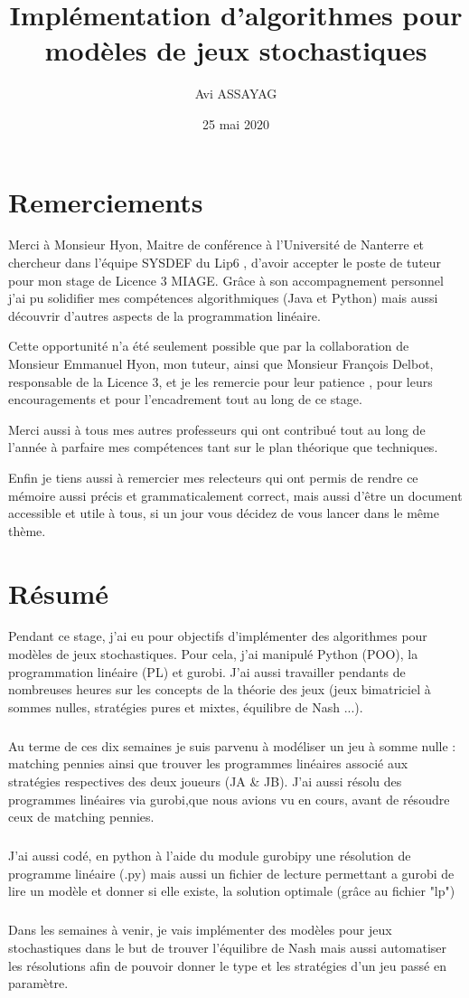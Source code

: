 \documentclass[a4paper, 12pt, twoside]{article}
\author{Avi ASSAYAG}
\title{Implémentation d'algorithmes pour modèles de jeux stochastiques}
\date{25 mai 2020}
\begin{document}
\pagedegarde


\section*{Remerciements}
Merci à Monsieur Hyon, Maitre de conférence à l'Université de Nanterre et chercheur dans l'équipe SYSDEF du Lip6 , d'avoir accepter le poste de tuteur pour mon stage de Licence 3 MIAGE. Grâce à son accompagnement personnel j'ai pu solidifier mes compétences algorithmiques (Java et Python) mais aussi découvrir d'autres aspects de la programmation linéaire.
\newline 

Cette opportunité n'a été seulement possible que par la collaboration de Monsieur Emmanuel Hyon, mon tuteur, ainsi que Monsieur François Delbot, responsable de la Licence 3, et je les remercie pour leur patience , pour leurs encouragements et pour l'encadrement tout au long de ce stage.
\newline

Merci aussi à tous mes autres professeurs qui ont contribué tout au long de l'année à parfaire  mes compétences tant sur le plan théorique que techniques. \newline

Enfin je tiens aussi à remercier mes relecteurs qui ont permis de rendre ce mémoire aussi précis et grammaticalement correct, mais aussi d'être un document accessible et utile à tous, si un jour vous décidez de vous lancer dans le même thème.
\newpage
\section*{Résumé}
Pendant ce stage, j'ai eu pour objectifs d'implémenter des algorithmes pour modèles de jeux stochastiques. Pour cela, j'ai manipulé \textsf{Python (POO)}, la \textsf{programmation linéaire (PL)} et \textsf{gurobi}. J'ai aussi travailler pendants de nombreuses heures sur les concepts de la théorie des jeux (jeux bimatriciel à sommes nulles, stratégies pures et mixtes, équilibre de Nash ...).
\subparagraph*{}{Au terme de ces dix semaines je suis parvenu à modéliser un jeu à somme nulle : \textsf{matching pennies} ainsi que trouver les programmes linéaires associé aux stratégies respectives des deux joueurs (JA \& JB). J'ai aussi résolu des programmes linéaires via \textsf{gurobi},que nous avions vu en cours, avant de résoudre ceux de \textsf{matching pennies}.}
\subparagraph*{}{J'ai aussi codé, en python à l'aide du module \textsf{gurobipy} une résolution de programme linéaire (.py) mais aussi un fichier de lecture permettant a \textsf{gurobi} de lire un modèle et donner si elle existe, la solution optimale (grâce au fichier "lp")}
\subparagraph*{}{Dans les semaines à venir, je vais implémenter des modèles pour \textsf{jeux stochastiques} dans le but de trouver l'\textsf{équilibre de Nash} mais aussi automatiser les résolutions afin de pouvoir donner le type et les stratégies d'un jeu passé en paramètre.} 
\end{document}
